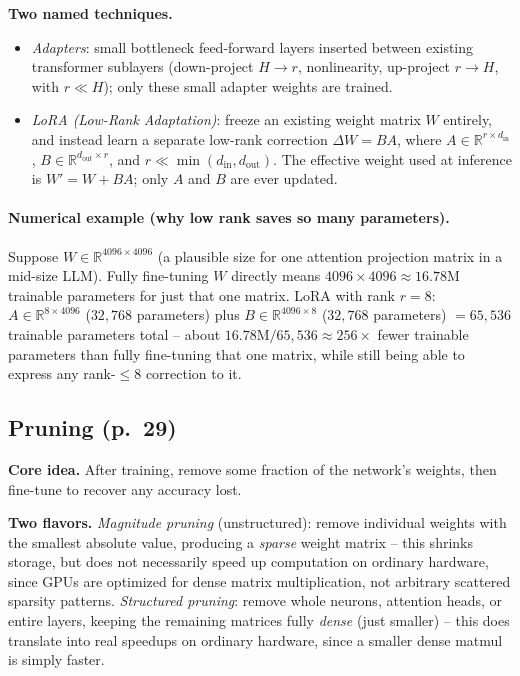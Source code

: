 \documentclass[11pt]{article}
\begin{document}
\textbf{Two named techniques.}
\begin{itemize}
\item \emph{Adapters}: small bottleneck feed-forward layers inserted between existing transformer sublayers (down-project $H\to r$, nonlinearity, up-project $r\to H$, with $r\ll H$); only these small adapter weights are trained.
\item \emph{LoRA (Low-Rank Adaptation)}: freeze an existing weight matrix $W$ entirely, and instead learn a separate low-rank correction $\Delta W = BA$, where $A\in\mathbb{R}^{r\times d_{\text{in}}}$, $B\in\mathbb{R}^{d_{\text{out}}\times r}$, and $r\ll\min(d_{\text{in}},d_{\text{out}})$. The effective weight used at inference is $W' = W + BA$; only $A$ and $B$ are ever updated.
\end{itemize}

\paragraph{Numerical example (why low rank saves so many parameters).} Suppose $W\in\mathbb{R}^{4096\times4096}$ (a plausible size for one attention projection matrix in a mid-size LLM). Fully fine-tuning $W$ directly means $4096\times4096\approx16.78$M trainable parameters for just that one matrix. LoRA with rank $r=8$: $A\in\mathbb{R}^{8\times4096}$ ($32{,}768$ parameters) plus $B\in\mathbb{R}^{4096\times8}$ ($32{,}768$ parameters) $=65{,}536$ trainable parameters total -- about $16.78\text{M}/65{,}536\approx256\times$ fewer trainable parameters than fully fine-tuning that one matrix, while still being able to express any rank-$\le\!8$ correction to it.

\subsection{Pruning (p.\ 29)}

\textbf{Core idea.} After training, remove some fraction of the network's weights, then fine-tune to recover any accuracy lost.

\textbf{Two flavors.} \emph{Magnitude pruning} (unstructured): remove individual weights with the smallest absolute value, producing a \emph{sparse} weight matrix -- this shrinks storage, but does not necessarily speed up computation on ordinary hardware, since GPUs are optimized for dense matrix multiplication, not arbitrary scattered sparsity patterns. \emph{Structured pruning}: remove whole neurons, attention heads, or entire layers, keeping the remaining matrices fully \emph{dense} (just smaller) -- this does translate into real speedups on ordinary hardware, since a smaller dense matmul is simply faster.
\end{document}
